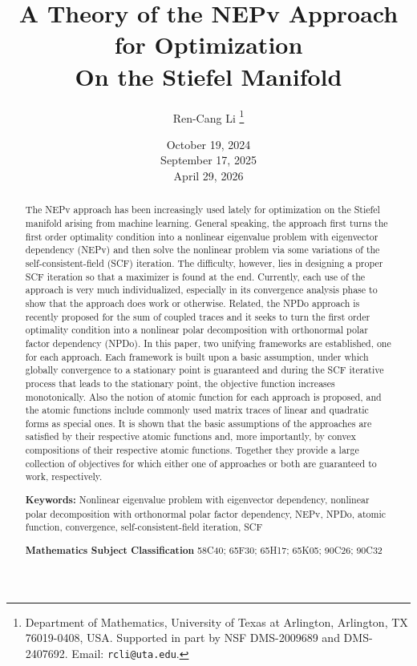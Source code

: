 \documentclass[11pt]{article}
\title{A Theory of the NEPv Approach for Optimization \\
         On the Stiefel Manifold}
\author{Ren-Cang Li%
\thanks{Department of Mathematics, University of Texas at Arlington, Arlington, TX 76019-0408, USA.
        Supported in part by NSF DMS-2009689 and DMS-2407692.
        Email: {\tt rcli@uta.edu}.}
}
\date{%
      October 19, 2024 \\
      September 17, 2025 \\
      April 29, 2026
}
\theoremstyle{definition}
\numberwithin{equation}{section}
\begin{document}
\maketitle

\begin{abstract}
The NEPv approach has been increasingly used lately for optimization on the Stiefel manifold arising
from machine learning. General speaking, the approach first turns the first order optimality condition
into a nonlinear eigenvalue problem with eigenvector dependency (NEPv) and then solve the nonlinear problem
via some variations of the self-consistent-field (SCF) iteration. The difficulty, however, lies in designing
a proper SCF iteration so that a maximizer is found at the end.
Currently, each use of the approach is very much individualized, especially in its convergence analysis phase
to show that the approach does work or otherwise. Related, the NPDo approach is recently
proposed for the sum of coupled traces and it seeks to
turn  the first order optimality condition into a nonlinear polar decomposition
with orthonormal polar factor dependency (NPDo).  In this paper, two unifying frameworks are established,
one for each approach.
Each framework is built upon
a basic assumption, under which globally convergence to a stationary point is guaranteed
and during the SCF iterative process that leads to the stationary point, the objective function increases monotonically.
Also the notion of atomic function for each approach is proposed, and the atomic functions include commonly used matrix traces of linear and quadratic forms  as special ones. It is shown
that the basic assumptions of the approaches are satisfied by their respective atomic functions and, more importantly, by convex compositions
of their respective atomic functions. Together they provide a large collection of objectives
for which either one of approaches or both
are guaranteed to work, respectively.

\bigskip
\noindent
{\bf Keywords:}
Nonlinear eigenvalue problem with eigenvector dependency, nonlinear polar decomposition with orthonormal polar factor dependency, NEPv, NPDo, atomic function,
convergence, self-consistent-field iteration, SCF

\smallskip
\noindent
{\bf Mathematics Subject Classification}  58C40; 65F30; 65H17; 65K05; 90C26; 90C32
\end{abstract}

\clearpage
{\scriptsize
\tableofcontents
}
\end{document}
